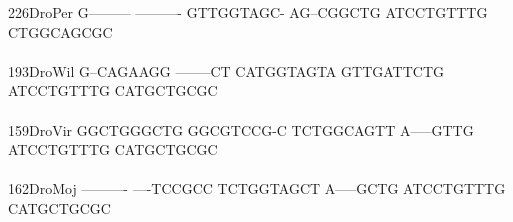 \documentclass[11pt,twoside,reqno,a4paper]{article}
\begin{document}
{226\hspace*{1\charwidth}DroPer	G---------	----------	GTTGGTAGC-	AG--CGGCTG	ATCCTGTTTG	CTGGCAGCGC	\\
\hspace*{4\charwidth}\hspace*{7\charwidth}\hspace*{1\charwidth}\hspace*{1\charwidth}\hspace*{1\charwidth}\hspace*{1\charwidth}\hspace*{1\charwidth}\hspace*{1\charwidth}\\
193\hspace*{1\charwidth}DroWil	G--CAGAAGG	--------CT	CATGGTAGTA	GTTGATTCTG	ATCCTGTTTG	CATGCTGCGC	\\
\hspace*{4\charwidth}\hspace*{7\charwidth}\hspace*{1\charwidth}\hspace*{1\charwidth}\hspace*{1\charwidth}\hspace*{1\charwidth}\hspace*{1\charwidth}\hspace*{1\charwidth}\\
159\hspace*{1\charwidth}DroVir	GGCTGGGCTG	GGCGTCCG-C	TCTGGCAGTT	A-----GTTG	ATCCTGTTTG	CATGCTGCGC	\\
\hspace*{4\charwidth}\hspace*{7\charwidth}\hspace*{1\charwidth}\hspace*{1\charwidth}\hspace*{1\charwidth}\hspace*{1\charwidth}\hspace*{1\charwidth}\hspace*{1\charwidth}\\
162\hspace*{1\charwidth}DroMoj	----------	----TCCGCC	TCTGGTAGCT	A-----GCTG	ATCCTGTTTG	CATGCTGCGC	\\
\hspace*{4\charwidth}\hspace*{7\charwidth}\hspace*{1\charwidth}\hspace*{1\charwidth}\hspace*{1\charwidth}\hspace*{1\charwidth}\hspace*{1\charwidth}\hspace*{1\charwidth}\\
}
\end{document}

